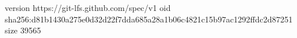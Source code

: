 version https://git-lfs.github.com/spec/v1
oid sha256:d81b1430a275e0d32d22f7dda685a28a1b06c4821c15b97ac1292ffdc2d87251
size 39565
